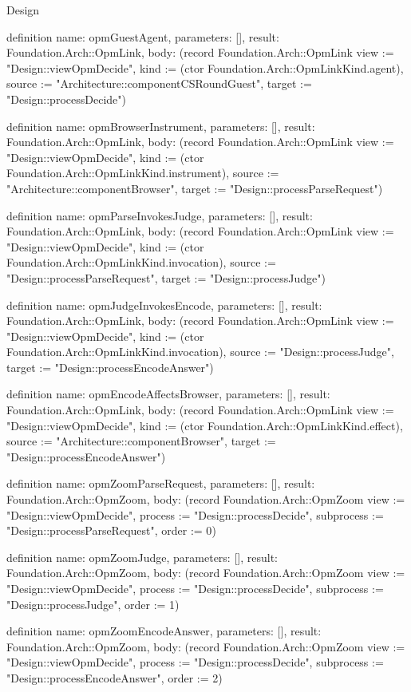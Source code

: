 \begin{lexlean}{Design}
\begin{semanticmodule}
definition{
  name: opmGuestAgent,
  parameters: [],
  result: Foundation.Arch::OpmLink,
  body: (record Foundation.Arch::OpmLink {view := "Design::viewOpmDecide", kind := (ctor Foundation.Arch::OpmLinkKind.agent), source := "Architecture::componentCSRoundGuest", target := "Design::processDecide"})
}

definition{
  name: opmBrowserInstrument,
  parameters: [],
  result: Foundation.Arch::OpmLink,
  body: (record Foundation.Arch::OpmLink {view := "Design::viewOpmDecide", kind := (ctor Foundation.Arch::OpmLinkKind.instrument), source := "Architecture::componentBrowser", target := "Design::processParseRequest"})
}

definition{
  name: opmParseInvokesJudge,
  parameters: [],
  result: Foundation.Arch::OpmLink,
  body: (record Foundation.Arch::OpmLink {view := "Design::viewOpmDecide", kind := (ctor Foundation.Arch::OpmLinkKind.invocation), source := "Design::processParseRequest", target := "Design::processJudge"})
}

definition{
  name: opmJudgeInvokesEncode,
  parameters: [],
  result: Foundation.Arch::OpmLink,
  body: (record Foundation.Arch::OpmLink {view := "Design::viewOpmDecide", kind := (ctor Foundation.Arch::OpmLinkKind.invocation), source := "Design::processJudge", target := "Design::processEncodeAnswer"})
}

definition{
  name: opmEncodeAffectsBrowser,
  parameters: [],
  result: Foundation.Arch::OpmLink,
  body: (record Foundation.Arch::OpmLink {view := "Design::viewOpmDecide", kind := (ctor Foundation.Arch::OpmLinkKind.effect), source := "Architecture::componentBrowser", target := "Design::processEncodeAnswer"})
}

definition{
  name: opmZoomParseRequest,
  parameters: [],
  result: Foundation.Arch::OpmZoom,
  body: (record Foundation.Arch::OpmZoom {view := "Design::viewOpmDecide", process := "Design::processDecide", subprocess := "Design::processParseRequest", order := 0})
}

definition{
  name: opmZoomJudge,
  parameters: [],
  result: Foundation.Arch::OpmZoom,
  body: (record Foundation.Arch::OpmZoom {view := "Design::viewOpmDecide", process := "Design::processDecide", subprocess := "Design::processJudge", order := 1})
}

definition{
  name: opmZoomEncodeAnswer,
  parameters: [],
  result: Foundation.Arch::OpmZoom,
  body: (record Foundation.Arch::OpmZoom {view := "Design::viewOpmDecide", process := "Design::processDecide", subprocess := "Design::processEncodeAnswer", order := 2})
}


\end{semanticmodule}
\end{lexlean}
